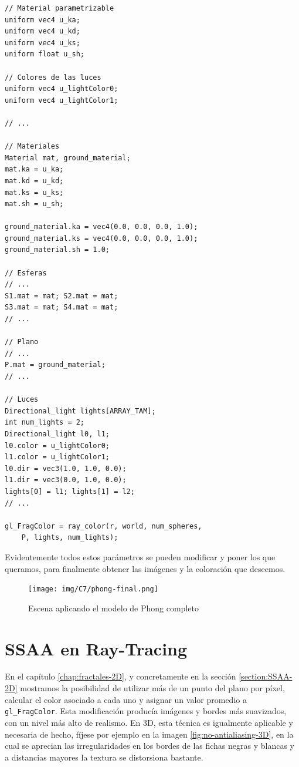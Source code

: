 \begin{lstlisting}
// Material parametrizable
uniform vec4 u_ka;
uniform vec4 u_kd;
uniform vec4 u_ks;
uniform float u_sh;

// Colores de las luces
uniform vec4 u_lightColor0;
uniform vec4 u_lightColor1;

// ... 

// Materiales
Material mat, ground_material;
mat.ka = u_ka;
mat.kd = u_kd;
mat.ks = u_ks;
mat.sh = u_sh;

ground_material.ka = vec4(0.0, 0.0, 0.0, 1.0);
ground_material.ks = vec4(0.0, 0.0, 0.0, 1.0);
ground_material.sh = 1.0;

// Esferas
// ... 
S1.mat = mat; S2.mat = mat;
S3.mat = mat; S4.mat = mat;
// ...

// Plano
// ...
P.mat = ground_material;
// ... 

// Luces
Directional_light lights[ARRAY_TAM];
int num_lights = 2;
Directional_light l0, l1;
l0.color = u_lightColor0; 
l1.color = u_lightColor1;
l0.dir = vec3(1.0, 1.0, 0.0);
l1.dir = vec3(0.0, 1.0, 0.0);
lights[0] = l1; lights[1] = l2;
// ... 

gl_FragColor = ray_color(r, world, num_spheres, 
    P, lights, num_lights);
\end{lstlisting}

Evidentemente todos estos parámetros se pueden modificar y poner los que queramos, para finalmente obtener las imágenes y la coloración que deseemos.

\begin{figure} [ht]
    \centering
    \texttt{[image: img/C7/phong-final.png]}
    \caption{Escena aplicando el modelo de Phong completo}
    \label{fig:phong-final}
\end{figure}

\section{SSAA en Ray-Tracing}

En el capítulo \ref{chap:fractales-2D}, y concretamente en la sección \ref{section:SSAA-2D} mostramos la posibilidad de utilizar más de un punto del plano por píxel, calcular el color asociado a cada uno y asignar un valor promedio a \verb|gl_FragColor|. Esta modificación producía imágenes y bordes más suavizados, con un nivel más alto de realismo. En 3D, esta técnica es igualmente aplicable y necesaria de hecho, fíjese por ejemplo en la imagen \ref{fig:no-antialiasing-3D}, en la cual se aprecian las irregularidades en los bordes de las fichas negras y blancas y a distancias mayores la textura se distorsiona bastante.

